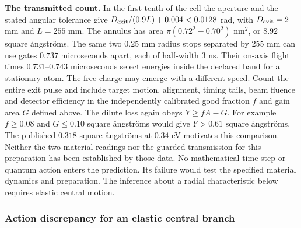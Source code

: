 \documentclass[11pt,a4paper]{article}
\begin{document}
\textbf{The transmitted count.} In the first tenth of the cell the
aperture and the stated angular tolerance give
\(D_{\rm exit}/(0.9L)+0.004
<0.0128\) rad, with \(D_{\rm exit}=2\) mm and \(L=255\) mm. The annulus
has area \(\pi(0.72^2-0.70^2)\) nm\(^2\), or \(8.92\) square ångströms.
The same two \(0.25\) mm radius stops separated by \(255\) mm can use
gates \(0.737\) microseconds apart, each of half-width \(3\) ns. Their
on-axis flight times \(0.731\)--\(0.743\) microseconds select energies
inside the declared band for a stationary atom. The free charge may
emerge with a different speed. Count the entire exit pulse and include
target motion, alignment, timing tails, beam fluence and detector
efficiency in the independently calibrated good fraction \(f\) and gain
area \(G\) defined above. The dilute loss again obeys \(Y\ge fA-G\). For
example \(f\ge0.08\) and \(G\le0.10\) square ångströms would give
\(Y>0.61\) square ångströms. The published \(0.318\) square ångströms at
\(0.34\) eV motivates this comparison. Neither the two material readings
nor the guarded transmission for this preparation has been established
by those data. No mathematical time step or quantum action enters the
prediction. Its failure would test the specified material dynamics and
preparation. The inference about a radial characteristic below requires
elastic central motion.

\subsubsection{Action discrepancy for an elastic central
branch}\label{action-discrepancy-for-an-elastic-central-branch}
\end{document}
